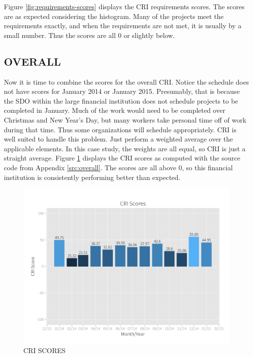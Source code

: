 \documentclass[SDSUThesis.tex]{subfiles}
\begin{document}
        Figure \ref{fig:requirements-scores} displays the CRI requirements
        scores. The scores are as expected considering the histogram. Many
        of the projects meet the requirements exactly, and when the requirements
        are not met, it is usually by a small number.
        Thus the scores are all 0 or slightly below.
        
    \subsection{OVERALL}
        Now it is time to combine the scores for the overall CRI.  Notice
        the schedule does not have scores for January 2014 or January 2015.
        Presumably, that is because the SDO within the large financial institution
        does not schedule projects to be completed in January. Much of the work
        would need to be completed over Christmas and New Year's Day, but many
        workers take personal time off of work during that time.  Thus some
        organizations will schedule appropriately.  CRI is well suited to
        handle this problem.  Just perform a weighted average over the
        applicable elements.  In this case study, the weights are all equal,
        so CRI is just a straight average.  Figure \ref{fig:cri-scores}
        displays the CRI scores as computed with the source code
        from Appendix \ref{src:overall}.  The scores are all above 0, so this
        financial institution is consistently performing better
        than expected.  
        
        \begin{figure}[ht]
            \centering
            \includegraphics[scale=.3]{images/cri_scores.png}
            \caption{CRI SCORES}
            \label{fig:cri-scores}
        \end{figure}
        
\end{document}
